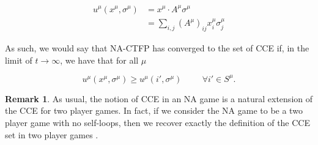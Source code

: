 \documentclass{article}
\theoremstyle{definition}
\newtheorem*{remark}{Remark}
\newcommand{\xmu}{x^{\mu}}
\newcommand{\refmu}{\sigma^{\mu}}
\begin{document}
  \begin{align}
    u^\mu(\xmu, \refmu) & = \xmu \cdot A^\mu \refmu \nonumber \\
    & = \sum_{i, j} (A^\mu)_{ij} \xmu_i \refmu_j \nonumber 
  \end{align}

  As such, we would say that NA-CTFP has converged to the set of CCE if, in the limit of $t
  \rightarrow \infty$, we have that for all $\mu$

  \begin{equation}
    u^\mu (\xmu, \refmu) \geq u^\mu(i', \refmu) \hspace{1cm} \forall i' \in S^\mu.
  \end{equation}

  \begin{remark}
    As usual, the notion of CCE in an NA game is a natural extension of the CCE for two player
    games. In fact, if we consider the NA game to be a two player game with no self-loops, then
    we recover exactly the definition of the CCE set in two player games \cite{PayoffPerformance}.
  \end{remark}
\end{document}

